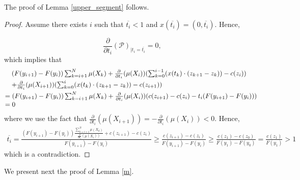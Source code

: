 \documentclass[12pt,reqno]{amsart}
\begin{document}
The proof of Lemma \ref{upper_segment} follows.
\begin{proof}
    
Assume there exists $i$ such that $\overline{t_i}<1$ and $x(\overline{t_i})=(0,\overline{t_i}).$ Hence,

\[\frac{\partial}{\partial t_i}(\mathcal{P})_{|t_i=\overline{t_i}}=0,\] which implies that 
\[\hspace{-0.5cm}\begin{array}{ll}

&\quad (F(y_{i+1})-F(y_i))\sum_{k=i+1}^N\mu( X_k)+\frac{\partial}{\partial t_i}(\mu( X_i))(\sum_{k=0}^{i-1}(x(t_{k})\cdot (z_{k+1}-z_{k}))-c(z_i))\vspace{3pt}\\
&\quad +\frac{\partial}{\partial t_i}(\mu( X_{i+1}))(\sum_{k=0}^{i}(x(t_{k})\cdot (z_{k+1}-z_{k}))-c(z_{i+1}))\vspace{3pt}\\
&=(F(y_{i+1})-F(y_i))\sum_{k=i+1}^N\mu( X_k)+\frac{\partial}{\partial t_i}(\mu( X_i))(c(z_{i+1})-c(z_i)-t_i(F(y_{i+1})-F(y_i)))\\
&=0
\end{array}\]
where we use the fact that $\frac{\partial}{\partial t_i}(\mu( X_{i+1}))=-\frac{\partial}{\partial t_i}(\mu( X_{i}))<0.$
Hence,
\[\begin{array}{ll}\overline{t_i}=\frac{(F(y_{i+1})-F(y_i))\frac{\sum_{k=i+1}^N\mu( X_k)}{\frac{\partial}{\partial t_i}(\mu( X_i))}+c(z_{i+1})-c(z_i)}{F(y_{i+1})-F(y_i)}\ge\frac{c(z_{i+1})-c(z_i)}{F(y_{i+1})-F(y_i)}\ge\frac{c(z_1)-c(z_0)}{F(y_1)-F(y_0)}=\frac{c(z_1)}{F(y_1)}>1
\end{array}\] which is a contradiction.
\end{proof} 



We present next the proof of Lemma \ref{m}.
\end{document}
